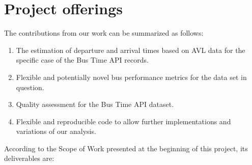 \documentclass[12pt]{report}
\begin{document}
\newpage

\section{Project offerings}

The contributions from our work can be summarized as follows:

\begin{enumerate}
\item The estimation of departure and arrival times based on AVL data for the specific case of the Bus Time API records. 
\item Flexible and potentially novel bus performance metrics for the data set in question.
\item Quality assessment for the Bus Time API dataset.
\item Flexible and reproducible code to allow further implementations and variations of our analysis.

\end{enumerate}

According to the Scope of Work presented at the beginning of this project, its deliverables are:
\end{document}
